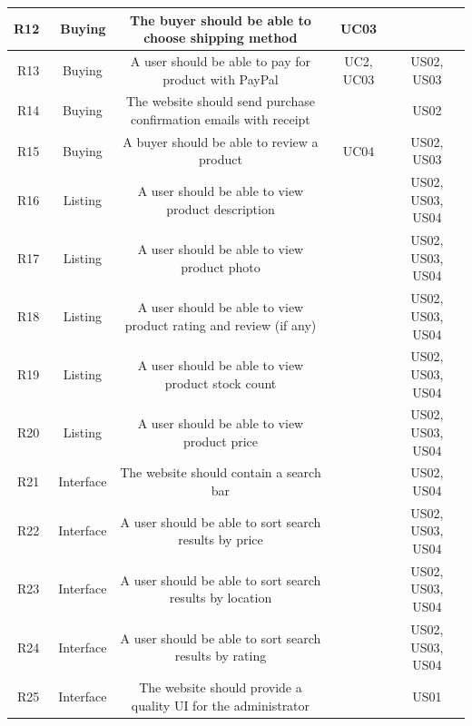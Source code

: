 \documentclass[11pt]{article}
\newcounter{use case ID}
\begin{document}
\begin{table}[htbp]
\begin{center}
\begin{tabular}{|r | c| c | c| c|}
                            \hline
                            R12 & \ Buying & The buyer should be able to choose shipping method & UC03 &  \\
                            \hline
                            R13 & \ Buying & A user should be able to pay for product with PayPal & UC2, UC03 & US02, US03 \\
                            \hline
                            R14 & \ Buying & The website should send purchase confirmation emails with receipt & & US02 \\ 
                            \hline
                            R15 & \ Buying & A buyer should be able to review a product & UC04 & US02, US03 \\ 
                            \hline
                            R16 & \ Listing & A user should be able to view product description & & US02, US03, US04 \\ 
                            \hline
                            R17 & \ Listing & A user should be able to view product photo & & US02, US03, US04 \\ 
                            \hline
                            R18 & \ Listing & A user should be able to view product rating and review (if any) & & US02, US03, US04 \\
                            \hline
                            R19 & \ Listing & A user should be able to view product stock count & & US02, US03, US04 \\ 
                            \hline
                            R20 & \ Listing & A user should be able to view product price & & US02, US03, US04 \\ 
                             \hline
                            R21 & \ Interface & The website should contain a search bar & & US02, US04 \\
                            \hline
                            R22 & \ Interface & A user should be able to sort search results by price  & & US02, US03, US04 \\ 
                            \hline
                            R23 & \ Interface & A user should be able to sort search results by location  & & US02, US03, US04 \\ 
                            \hline
                            R24 & \ Interface & A user should be able to sort search results by rating  & & US02, US03, US04 \\ 
                            \hline
                            R25 & \ Interface & The website should provide a quality UI for the administrator & & US01 \\ 

\end{tabular}
\end{center}
\end{table}
\end{document}
